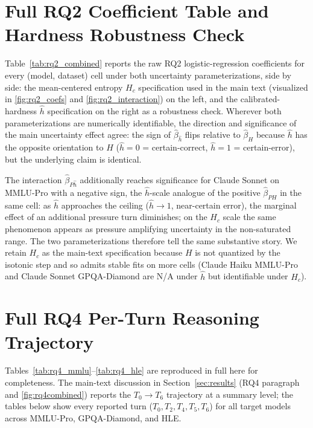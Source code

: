 \section{Full RQ2 Coefficient Table and Hardness Robustness Check}
\label{app:rq2_table}

Table~\ref{tab:rq2_combined} reports the raw RQ2 logistic-regression
coefficients for every (model, dataset) cell under both uncertainty
parameterizations, side by side: the mean-centered entropy $H_c$
specification used in the main text (visualized in
\autoref{fig:rq2_coefs} and \autoref{fig:rq2_interaction}) on the
left, and the calibrated-hardness $\hat h$ specification on the
right as a robustness check. Wherever both parameterizations are
numerically identifiable, the direction and significance of the
main uncertainty effect agree: the sign of $\hat\beta_{\hat h}$
flips relative to $\hat\beta_H$ because $\hat h$ has the opposite
orientation to $H$ ($\hat h {=} 0$ = certain-correct, $\hat h {=} 1$
= certain-error), but the underlying claim is identical.

The interaction $\hat\beta_{P\hat h}$ additionally reaches
significance for Claude Sonnet on MMLU-Pro with a negative sign,
the $\hat h$-scale analogue of the positive $\hat\beta_{PH}$ in the
same cell: as $\hat h$ approaches the ceiling ($\hat h \to 1$,
near-certain error), the marginal effect of an additional pressure
turn diminishes; on the $H_c$ scale the same phenomenon appears as
pressure amplifying uncertainty in the non-saturated range. The two
parameterizations therefore tell the same substantive story. We
retain $H_c$ as the main-text specification because $H$ is not
quantized by the isotonic step and so admits stable fits on more
cells (Claude Haiku MMLU-Pro and Claude Sonnet GPQA-Diamond are
N/A under $\hat h$ but identifiable under $H_c$).



\section{Full RQ4 Per-Turn Reasoning Trajectory}
\label{app:rq4}

Tables~\ref{tab:rq4_mmlu}--\ref{tab:rq4_hle} are reproduced in full here for completeness. The
main-text discussion in Section~\ref{sec:results} (RQ4 paragraph and
\autoref{fig:rq4combined}) reports the $T_0 \to T_6$ trajectory at a
summary level; the tables below show every reported turn
($T_0, T_2, T_4, T_5, T_6$) for all target models across MMLU-Pro, GPQA-Diamond, and HLE.

